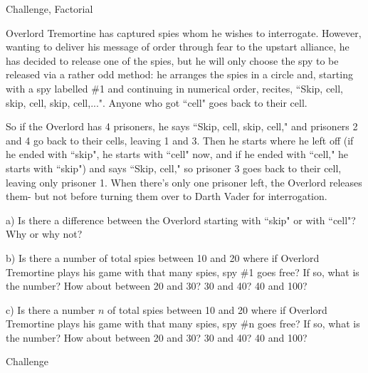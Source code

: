 \begin{tagblock}{Challenge, Factorial}
\begin{question}[CHALLENGE!!!]
	

\bigskip

Overlord Tremortine has captured spies whom he wishes to interrogate. However, wanting to deliver his message of order through fear to the upstart alliance, he has decided to release one of the spies, but he will only choose the spy to be released via a rather odd method: he arranges the spies in a circle and, starting with a spy labelled \#1 and continuing in numerical order, recites, ``Skip, cell, skip, cell, skip, cell,...". Anyone who got ``cell" goes back to their cell. 

So if the Overlord has 4 prisoners, he says ``Skip, cell, skip, cell," and prisoners 2 and 4 go back to their cells, leaving 1 and 3. Then he starts where he left off (if he ended with ``skip", he starts with ``cell" now, and if he ended with ``cell," he starts with ``skip") and says ``Skip, cell," so prisoner 3 goes back to their cell, leaving only prisoner 1. When there's only one prisoner left, the Overlord releases them- but not before turning them over to Darth Vader for interrogation.  

\bigskip

a) Is there a difference between the Overlord starting with ``skip" or with ``cell"? Why or why not?

\bigskip

b) Is there a number of total spies between 10 and 20 where if Overlord Tremortine plays his game with that many spies, spy \#1 goes free? If so, what is the number? How about between 20 and 30? 30 and 40? 40 and 100?

\bigskip

c) Is there a number $n$ of total spies between 10 and 20 where if Overlord Tremortine plays his game with that many spies, spy \#n goes free? If so, what is the number? How about between 20 and 30? 30 and 40? 40 and 100?
	
	
\begin{tags}
	    Challenge
\end{tags}
	
\begin{diary}
\end{diary}
		
\begin{solution}
       
\end{solution}

\end{question}

\end{tagblock}

